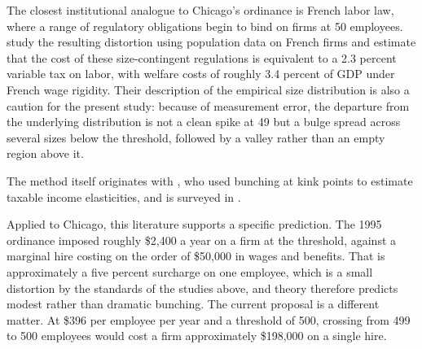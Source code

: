 \documentclass[12pt,letterpaper]{article}
\begin{document}
The closest institutional analogue to Chicago's ordinance is French labor law, where a range of regulatory obligations begin to bind on firms at 50 employees. \citet{garicano2016} study the resulting distortion using population data on French firms and estimate that the cost of these size-contingent regulations is equivalent to a 2.3 percent variable tax on labor, with welfare costs of roughly 3.4 percent of GDP under French wage rigidity. Their description of the empirical size distribution is also a caution for the present study: because of measurement error, the departure from the underlying distribution is not a clean spike at 49 but a bulge spread across several sizes below the threshold, followed by a valley rather than an empty region above it.

The method itself originates with \citet{saez2010}, who used bunching at kink points to estimate taxable income elasticities, and is surveyed in \citet{kleven2016}.

Applied to Chicago, this literature supports a specific prediction. The 1995 ordinance imposed roughly \$2,400 a year on a firm at the threshold, against a marginal hire costing on the order of \$50,000 in wages and benefits. That is approximately a five percent surcharge on one employee, which is a small distortion by the standards of the studies above, and theory therefore predicts modest rather than dramatic bunching. The current proposal is a different matter. At \$396 per employee per year and a threshold of 500, crossing from 499 to 500 employees would cost a firm approximately \$198,000 on a single hire.
\end{document}
